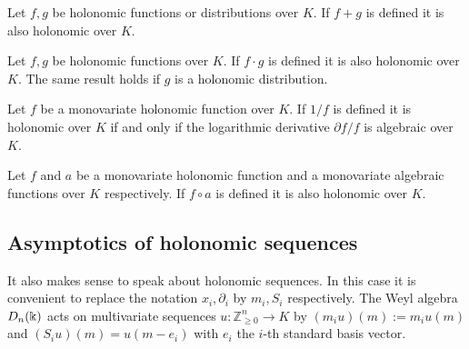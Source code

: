     \begin{theorem}{\cite[Proposition 3.1]{zeilberger1990holonomic}}
      Let $f,g$ be holonomic functions or distributions over $K$.
      If $f+g$ is defined it is also holonomic over $K$.
    \end{theorem}
    \begin{theorem}{\cite[Proposition 3.2]{zeilberger1990holonomic}}
      Let $f,g$ be holonomic functions over $K$.
      If $f\cdot g$ is defined it is also holonomic over $K$.
      The same result holds if $g$ is a holonomic distribution.
    \end{theorem}
    \begin{theorem}{\cite[Corollary 1]{harris1985reciprocals}}
      Let $f$ be a monovariate holonomic function over $K$.
      If $1/f$ is defined it is holonomic over $K$ if and only if the logarithmic derivative $\partial f/f$ is algebraic over $K$.
    \end{theorem}
    \begin{theorem}{\cite[Theorem 2.7]{stanley1980differentiably}}
      Let $f$ and $a$ be a monovariate holonomic function and a monovariate algebraic functions over $K$ respectively.
      If $f\circ a$ is defined it is also holonomic over $K$.
    \end{theorem}
    \subsection{Asymptotics of holonomic sequences}
    It also makes sense to speak about holonomic sequences.
    In this case it is convenient to replace the notation $x_i,\partial_i$ by $m_i,S_i$ respectively.
    The Weyl algebra $D_n(\Bbbk)$ acts on multivariate sequences $u:\mathbb{Z}_{\geq 0}^n \to K$ by $(m_iu)(m):= m_i u(m)$ and $(S_iu)(m) = u(m-e_i)$ with $e_i$ the $i$-th standard basis vector.

